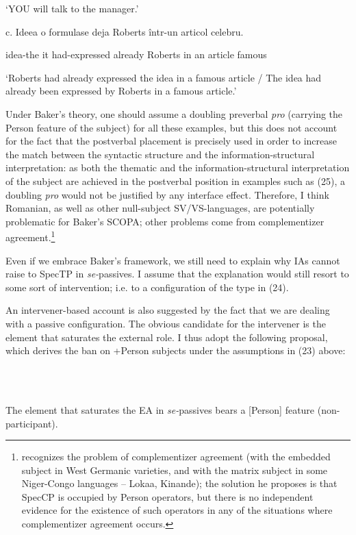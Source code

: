 \documentclass[output=paper]{langsci/langscibook}
\begin{document}
       ‘YOU will talk to the manager.’

c.   Ideea    o formulase         deja      Roberts într-un articol celebru. 

     idea-the it had-expressed already Roberts  in  an article  famous    

‘Roberts had already expressed the idea in a famous article / The idea had already been expressed by Roberts in a famous article.’      

Under Baker’s theory, one should assume a doubling preverbal \textit{pro} (carrying the Person feature of the subject) for all these examples, but this does not account for the fact that the postverbal placement is precisely used in order to increase the match between the syntactic structure and the information-structural interpretation: as both the thematic and the information-structural interpretation of the subject are achieved in the postverbal position in examples such as (25), a doubling \textit{pro} would not be justified by any interface effect. Therefore, I think Romanian, as well as other null-subject SV/VS-languages, are potentially problematic for Baker’s SCOPA; other problems come from complementizer agreement.\footnote{\citet{Baker2008} recognizes the problem of complementizer agreement (with the embedded subject in West Germanic varieties, and with the matrix subject in some Niger-Congo languages – Lokaa, Kinande); the solution he proposes is that SpecCP is occupied by Person operators, but there is no independent evidence for the existence of such operators in any of the situations where complementizer agreement occurs.}

  Even if we embrace Baker’s framework, we still need to explain why IAs cannot raise to SpecTP in \textit{se-}passives. I assume that the explanation would still resort to some sort of intervention; i.e. to a configuration of the type in (24). 

  An intervener-based account is also suggested by the fact that we are dealing with a passive configuration. The obvious candidate for the intervener is the element that saturates the external role. I thus adopt the following proposal, which derives the ban on +Person subjects under the assumptions in (23) above:

\ea%
    \label{ex:key:26}
    \gll\\
        \\
    \glt
    \z

          The element that saturates the EA in \textit{se-}passives bears a [Person] feature (non-participant).
\end{document}
